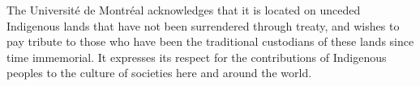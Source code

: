 
The Université de Montréal acknowledges that it is located on unceded Indigenous lands that have not been surrendered through treaty, and wishes to pay tribute to those who have been the traditional custodians of these lands since time immemorial. It expresses its respect for the contributions of Indigenous peoples to the culture of societies here and around the world.

